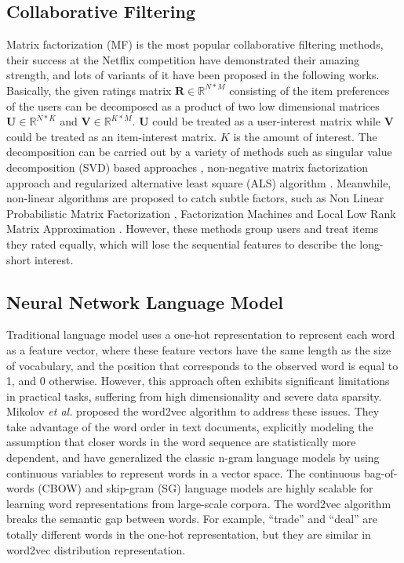 \documentclass{llncs}
\begin{document}
\subsection{Collaborative Filtering}
Matrix factorization (MF) is the most popular collaborative filtering methods,
their success at the Netflix competition \cite{koren2009matrix}
have demonstrated their amazing strength,
and lots of variants of it have been proposed in the following works.
Basically, the given ratings matrix $\mathbf{R} \in \mathbb{R}^{N*M}$
consisting of the item preferences of the users can be decomposed as
a product of two low dimensional matrices $\mathbf{U} \in \mathbb{R}^{N*K}$
and $\mathbf{V} \in \mathbb{R}^{K*M}$.
$\mathbf{U}$ could be treated as a user-interest matrix while
$\mathbf{V}$ could be treated as an item-interest matrix.
$K$ is the amount of interest.
The decomposition can be carried out by a variety of methods
such as singular value decomposition (SVD) based approaches \cite{mazumder2010spectral},
non-negative matrix factorization approach \cite{lee2001algorithms}
and regularized alternative least square (ALS) algorithm \cite{zhou2008large}.
Meanwhile, non-linear algorithms are proposed to catch subtle factors,
such as Non Linear Probabilistic Matrix Factorization \cite{lawrence2009non},
Factorization Machines \cite{rendle2010factorization} and
Local Low Rank Matrix Approximation \cite{lee2013local}.
However, these methods group users and treat items they rated equally,
which will lose the sequential features to describe the long-short interest.

\subsection{Neural Network Language Model}
Traditional language model uses a one-hot representation to represent each word
as a feature vector, where these feature vectors have the same length as the size
of vocabulary, and the position that corresponds to the observed word is equal to 1,
and 0 otherwise. However, this approach often exhibits significant limitations
in practical tasks, suffering from high dimensionality and severe data sparsity.
Mikolov \textit{et al.} \cite{mikolov2013efficient} proposed
the word2vec algorithm to address these issues. They take advantage of the word order
in text documents, explicitly modeling the assumption that closer words in the word
sequence are statistically more dependent, and have generalized the classic n-gram
language models by using continuous variables to represent words in a vector space.
The continuous bag-of-words (CBOW) and skip-gram (SG) language models are highly
scalable for learning word representations from large-scale corpora.
The word2vec algorithm breaks the semantic gap between words.
For example, ``trade'' and ``deal'' are totally different words in the one-hot representation,
but they are similar in word2vec distribution representation.
\end{document}
